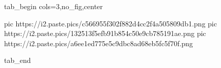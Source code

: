  
 
 
 
 


\ifcmt
  tab_begin cols=3,no_fig,center

     pic https://i2.paste.pics/c566955f302f882d4cc2f4a505809db1.png
		 pic https://i2.paste.pics/132513f5efb91b854c50e9cb785191ae.png
		 pic https://i2.paste.pics/a6ee1ed775e5c9dbc8ad68eb5fc5f70f.png

  tab_end
\fi
